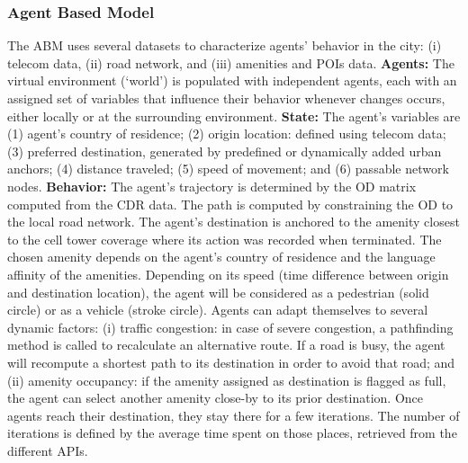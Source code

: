 {{        \subsubsection{Agent Based Model}
        {
            The ABM uses several datasets to characterize agents' behavior in the city: (i) telecom data, (ii) road network, and (iii) amenities and POIs data.
            \newline
            \textbf{Agents:} The virtual environment (`world') is populated with independent agents, each with an assigned set of variables that influence their behavior whenever changes occurs, either locally or at the surrounding environment. \textbf{State:} The agent's variables are (1) agent's country of residence; (2) origin location: defined using telecom data; (3) preferred destination, generated by predefined or dynamically added urban anchors; (4) distance traveled; (5) speed of movement; and (6) passable network nodes. \textbf{Behavior:} The agent's trajectory is determined by the OD matrix computed from the CDR data. The path is computed by constraining the OD to the local road network. The agent's destination is anchored to the amenity closest to the cell tower coverage where its action was recorded when terminated. The chosen amenity depends on the agent's country of residence and the language affinity of the amenities. Depending on its speed (time difference between origin and destination location), the agent will be considered as a pedestrian (solid circle) or as a vehicle (stroke circle).
            \newline
            Agents can adapt themselves to several dynamic factors: (i) traffic congestion: in case of severe congestion, a pathfinding method is called to recalculate an alternative route. If a road is busy, the agent will recompute a shortest path to its destination in order to avoid that road; and (ii) amenity occupancy: if the amenity assigned as destination is flagged as full, the agent can select another amenity close-by to its prior destination. Once agents reach their destination, they stay there for a few iterations. The number of iterations is defined by the average time spent on those places, retrieved from the different APIs.
        }

}}
